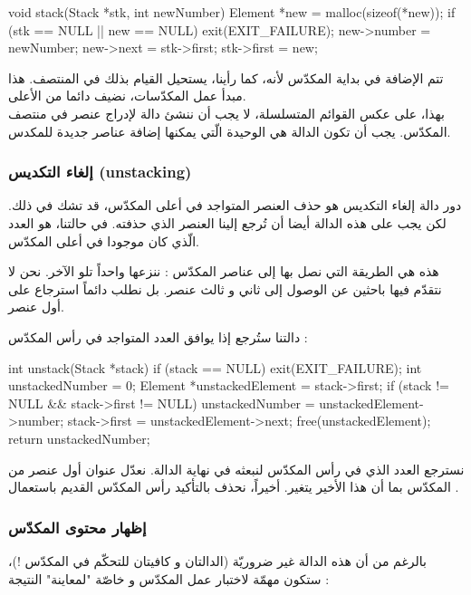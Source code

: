 \begin{Csource}
void stack(Stack *stk, int newNumber)
{
	Element *new = malloc(sizeof(*new));
	if (stk == NULL || new == NULL)
	{
		exit(EXIT_FAILURE);
	}
	new->number = newNumber;
	new->next = stk->first;
	stk->first = new;
}
\end{Csource}

تتم الإضافة في بداية المكدّس لأنه، كما رأينا، يستحيل القيام بذلك في المنتصف. هذا مبدأ عمل المكدّسات، نضيف دائما من الأعلى. \\
بهذا، على عكس القوائم المتسلسلة، لا يجب أن ننشئ دالة لإدراج عنصر في منتصف المكدّس. يجب أن تكون الدالة
هي الوحيدة الّتي يمكنها إضافة عناصر جديدة للمكدس.

\subsubsection{إلغاء التكديس (\textenglish{unstacking})}

دور دالة إلغاء التكديس هو حذف العنصر المتواجد في أعلى المكدّس، قد تشك في ذلك. لكن يجب على هذه الدالة أيضا أن تُرجع إلينا العنصر الذي حذفته. في حالتنا، هو العدد الّذي كان موجودا في أعلى المكدّس.

هذه هي الطريقة التي نصل بها إلى عناصر المكدّس : ننزعها واحداً تلو الآخر. نحن لا نتقدّم فيها باحثين عن الوصول إلى ثاني و ثالث عنصر. بل نطلب دائماً استرجاع على أول عنصر.

دالتنا
ستُرجع إذا
يوافق العدد المتواجد في رأس المكدّس  :

\begin{Csource}
int unstack(Stack *stack)
{
	if (stack == NULL)
	{
		exit(EXIT_FAILURE);
	}
	int unstackedNumber = 0;
	Element *unstackedElement = stack->first;
	if (stack != NULL && stack->first != NULL)
	{
		unstackedNumber = unstackedElement->number;
		stack->first = unstackedElement->next;
		free(unstackedElement);
	}
	return unstackedNumber;
}
\end{Csource}

نسترجع العدد الذي في رأس المكدّس لنبعثه في نهاية الدالة. نعدّل عنوان أول عنصر من المكدّس بما أن هذا الأخير يتغير.
أخيراً، نحذف بالتأكيد رأس المكدّس القديم باستعمال
.

\subsubsection{إظهار محتوى المكدّس}

بالرغم من أن هذه الدالة غير ضروريّة (الدالتان
و 
كافيتان للتحكّم في المكدّس !)، ستكون مهمّة لاختبار عمل المكدّس و خاصّة "لمعاينة" النتيجة :

